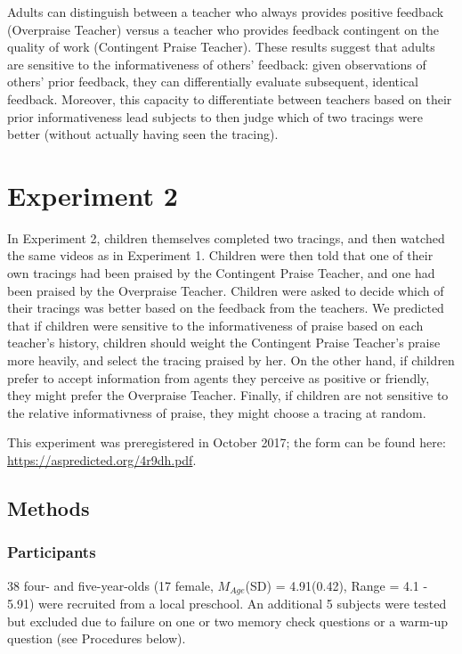 \documentclass[10pt, letterpaper]{article}
\begin{document}
Adults can distinguish between a teacher who always provides positive
feedback (Overpraise Teacher) versus a teacher who provides feedback
contingent on the quality of work (Contingent Praise Teacher). These
results suggest that adults are sensitive to the informativeness of
others' feedback: given observations of others' prior feedback, they can
differentially evaluate subsequent, identical feedback. Moreover, this
capacity to differentiate between teachers based on their prior
informativeness lead subjects to then judge which of two tracings were
better (without actually having seen the tracing).

\section{Experiment 2}\label{experiment-2}

In Experiment 2, children themselves completed two tracings, and then
watched the same videos as in Experiment 1. Children were then told that
one of their own tracings had been praised by the Contingent Praise
Teacher, and one had been praised by the Overpraise Teacher. Children
were asked to decide which of their tracings was better based on the
feedback from the teachers. We predicted that if children were sensitive
to the informativeness of praise based on each teacher's history,
children should weight the Contingent Praise Teacher's praise more
heavily, and select the tracing praised by her. On the other hand, if
children prefer to accept information from agents they perceive as
positive or friendly, they might prefer the Overpraise Teacher. Finally,
if children are not sensitive to the relative informativness of praise,
they might choose a tracing at random.

This experiment was preregistered in October 2017; the form can be found
here: \url{https://aspredicted.org/4r9dh.pdf}.

\subsection{Methods}\label{methods-1}

\subsubsection{Participants}\label{participants-1}

38 four- and five-year-olds (17 female, \(M_{Age}\)(SD) = 4.91(0.42),
Range = 4.1 - 5.91) were recruited from a local preschool. An additional
5 subjects were tested but excluded due to failure on one or two memory
check questions or a warm-up question (see Procedures below).
\end{document}
